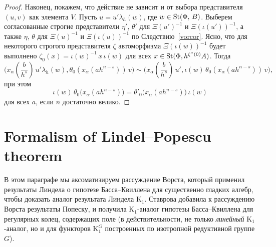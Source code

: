 \documentclass[oneside, 11pt]{amsart}
\begin{document}
\begin{proof}
Наконец, покажем, что действие не зависит и от выбора представителя $(u, v)$ как элемента $V$. Пусть $u = u' \lambda_h(w)$, где $w \in \mathop{\mathrm{St}}\nolimits(\Phi,\,B)$. Выберем согласованные строгие представители $\eta'$, $\theta'$ для $\Xi(u')^{-1}$ и $\Xi(\iota(u'))^{-1}$, а также $\eta$, $\theta$ для $\Xi(u)^{-1}$ и $\Xi(\iota(u))^{-1}$ по Следствию~\ref{vorcor}. Ясно, что для некоторого строгого представителя $\zeta$ автоморфизма $\Xi(\iota(w))^{-1}$ будет выполнено $\zeta_0(x) = \iota(w)^{-1}\, x\, \iota(w)$ для всех $x \in \mathop{\mathrm{St}}\nolimits(\Phi, h^{\zeta^*(0)} A)$.
Тогда
$$\textstyle
\bigl(x_\alpha(\frac b {h^s})\, u' \lambda_h(w), \theta_0(x_\alpha(ah^{n - s}))\, v\bigr) \sim \bigl(x_\alpha(\frac b {h^s})\, u', \iota(w)\, \theta_0(x_\alpha(ah^{n - s}))\, v\bigr),
$$
при этом
$$
\iota(w)\, \theta_0\big(x_\alpha(ah^{n-s})\big) = \theta'_0\big(x_\alpha(ah^{n-s})\big)\, \iota(w)
$$
для всех \(a\), если \(n\) достаточно велико.
\end{proof}










\section{Formalism of Lindel--Popescu theorem}
В этом параграфе мы аксоматизируем рассуждение Ворста, который применил результаты Линдела о гипотезе Басса--Квиллена для существенно гладких алгебр, чтобы доказать аналог результата Линдела $\mathrm K_1$. Ставрова добавила к рассуждению Ворста результаты Попеску, и получила $\mathrm K_1$-аналог гипотезы Басса--Квиллена для регулярных колец, содержащих поле (в действительности, не только {\it линейный} $\mathrm K_1$-аналог, но и для функторов $\mathrm K_1^G$ построенных по изотропной редуктивной группе $G$).
\end{document}
